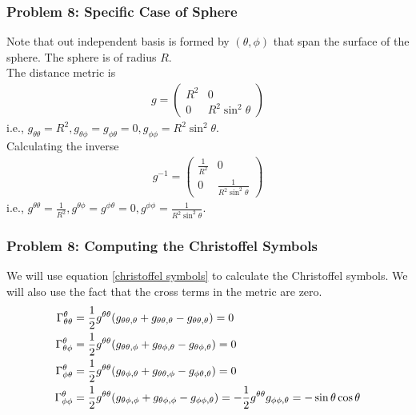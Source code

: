\begin{frame}
\frametitle{Problem 8: Specific Case of Sphere}
Note that out independent basis is formed by $(\theta,\phi)$ that span the surface of the sphere. The sphere is of radius $R$.\\ \pause
The distance metric is
\begin{align}
g=
\begin{pmatrix}
R^2 & 0\\
0 & R^2\sin^2\theta
\end{pmatrix}
\end{align}
i.e., $g_{\theta\theta}=R^2, g_{\theta\phi}=g_{\phi\theta}=0, g_{\phi\phi}=R^2\sin^2\theta$.\\ \pause
Calculating the inverse
\begin{align}
g^{-1}=
\begin{pmatrix}
\frac{1}{R^2} & 0\\
0 & \frac{1}{R^2\sin^2\theta}
\end{pmatrix}
\end{align}
i.e., $g^{\theta\theta}=\frac{1}{R^2}, g^{\theta\phi}=g^{\phi\theta}=0, g^{\phi\phi}=\frac{1}{R^2\sin^2\theta}$.\\
\end{frame}

\begin{frame}
\frametitle{Problem 8: Computing the Christoffel Symbols}
We will use equation \ref{christoffel symbols} to calculate the Christoffel symbols. We will also use the fact that the cross terms in the metric are zero.
\begin{align}
\Gamma^{\theta}_{\theta\theta}&=\frac{\displaystyle 1}{\displaystyle 2}g^{\theta\theta}(g_{\theta\theta ,\theta}+g_{\theta\theta ,\theta}-g_{\theta\theta ,\theta})=0\\
\Gamma^{\theta}_{\theta\phi}&=\frac{\displaystyle 1}{\displaystyle 2}g^{\theta\theta}(g_{\theta\theta ,\phi}+g_{\theta\phi ,\theta}-g_{\theta\phi ,\theta})=0\\
\Gamma^{\theta}_{\phi\theta}&=\frac{\displaystyle 1}{\displaystyle 2}g^{\theta\theta}(g_{\theta\phi ,\theta}+g_{\theta\theta ,\phi}-g_{\phi\theta ,\theta})=0\\
\Gamma^{\theta}_{\phi\phi}&=\frac{\displaystyle 1}{\displaystyle 2}g^{\theta\theta}(g_{\theta\phi ,\phi}+g_{\theta\phi ,\phi}-g_{\phi\phi ,\theta})=-\frac{\displaystyle 1}{\displaystyle 2}g^{\theta\theta}g_{\phi\phi ,\theta}=-\sin\theta\cos\theta
\end{align}
\end{frame}


